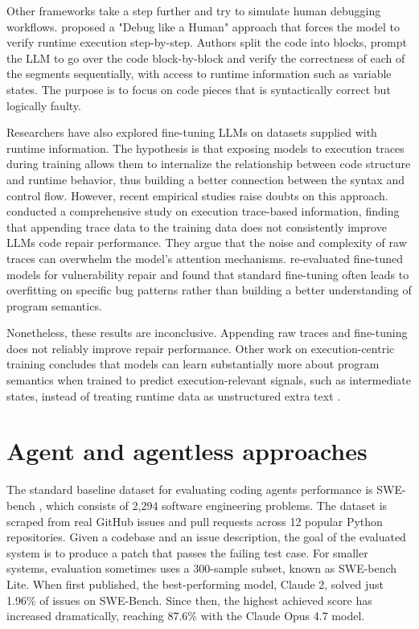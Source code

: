 Other frameworks take a step further and try to simulate human debugging workflows.
\citet{zhong2024debug} proposed a "Debug like a Human" approach that forces the model to verify runtime execution step-by-step.
Authors split the code into blocks, prompt the LLM to go over the code block-by-block and verify the correctness of each of the segments sequentially,
with access to runtime information such as variable states.
The purpose is to focus on code pieces that is syntactically correct but logically faulty.

Researchers have also explored fine-tuning LLMs on datasets supplied with runtime information.
The hypothesis is that exposing models to execution traces during training allows them to internalize the relationship between code structure and runtime behavior,
thus building a better connection between the syntax and control flow.
However, recent empirical studies raise doubts on this approach.
\citet{wang2025codesemanticshelpcomprehensive} conducted a comprehensive study on execution trace-based information,
finding that appending trace data to the training data does not consistently improve LLMs code repair performance.
They argue that the noise and complexity of raw traces can overwhelm the model's attention mechanisms.
\citet{han2025rethinkingcapabilityfinetunedlanguage} re-evaluated fine-tuned models for vulnerability repair
and found that standard fine-tuning often leads to overfitting on specific bug patterns
rather than building a better understanding of program semantics.

Nonetheless, these results are inconclusive. Appending raw traces and fine-tuning does not reliably improve repair performance.
Other work on execution-centric training concludes that models can learn substantially more about program semantics
when trained to predict execution-relevant signals, such as intermediate states,
instead of treating runtime data as unstructured extra text \citep{armengolestape2025execution}.

\section{Agent and agentless approaches}
\label{sec:agent-repair}

The standard baseline dataset for evaluating coding agents performance is SWE-bench \citet{jimenez2023swebench}, which consists of 2,294 software engineering problems.
The dataset is scraped from real GitHub issues and pull requests across 12 popular Python repositories.
Given a codebase and an issue description, the goal of the evaluated system is to produce a patch that passes the failing test case.
For smaller systems, evaluation sometimes uses a 300-sample subset, known as SWE-bench Lite.
When first published, the best-performing model, Claude 2, solved just 1.96\% of issues on SWE-Bench.
Since then, the highest achieved score has increased dramatically, reaching 87.6\% with the Claude Opus 4.7 model.

